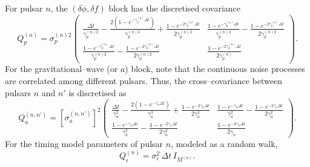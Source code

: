 \documentclass{tufte-handout} %
\begin{document}
	For pulsar $n$, the \((\delta\phi,\delta f)\) block has the discretised covariance
	\begin{equation}
		Q_p^{(n)} = \sigma_p^{(n)2}\begin{pmatrix}
			\displaystyle \frac{\Delta t}{\gamma_p^{(n)2}} - \frac{2\left(1-e^{-\gamma_p^{(n)}\Delta t}\right)}{\gamma_p^{(n)3}} + \frac{1-e^{-2\gamma_p^{(n)}\Delta t}}{2\gamma_p^{(n)3}} & \displaystyle \frac{1-e^{-\gamma_p^{(n)}\Delta t}}{\gamma_p^{(n)2}} - \frac{1-e^{-2\gamma_p^{(n)}\Delta t}}{2\gamma_p^{(n)2}}\\[2mm]
			\displaystyle \frac{1-e^{-\gamma_p^{(n)}\Delta t}}{\gamma_p^{(n)2}} - \frac{1-e^{-2\gamma_p^{(n)}\Delta t}}{2\gamma_p^{(n)2}} & \displaystyle \frac{1-e^{-2\gamma_p^{(n)}\Delta t}}{2\gamma_p^{(n)}}
		\end{pmatrix}.
	\end{equation}
	For the gravitational--wave (or \(a\)) block, note that the continuous noise processes are correlated among different pulsars. Thus, the cross–covariance between pulsars $n$ and $n'$ is discretised as
	\begin{equation}
		Q_a^{(n,n')} = \left[\sigma_a^{(n,n')}\right]^2\begin{pmatrix}
			\displaystyle \frac{\Delta t}{\gamma_a^2} - \frac{2\left(1-e^{-\gamma_a\Delta t}\right)}{\gamma_a^3} + \frac{1-e^{-2\gamma_a\Delta t}}{2\gamma_a^3} & \displaystyle \frac{1-e^{-\gamma_a\Delta t}}{\gamma_a^2} - \frac{1-e^{-2\gamma_a\Delta t}}{2\gamma_a^2}\\[2mm]
			\displaystyle \frac{1-e^{-\gamma_a\Delta t}}{\gamma_a^2} - \frac{1-e^{-2\gamma_a\Delta t}}{2\gamma_a^2} & \displaystyle \frac{1-e^{-2\gamma_a\Delta t}}{2\gamma_a}
		\end{pmatrix}.
	\end{equation}
	For the timing model parameters of pulsar $n$, modeled as a random walk,
	\begin{equation}
		Q_\epsilon^{(n)} = \sigma_\epsilon^2\,\Delta t\,I_{M^{(n)}}.
	\end{equation}
	
\end{document}
